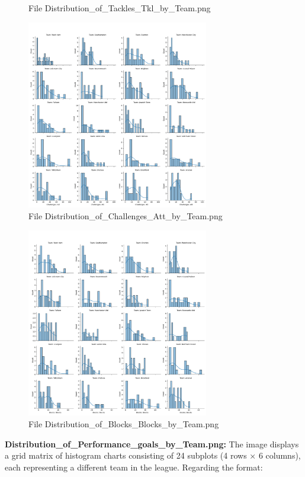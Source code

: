 \documentclass[12pt]{report}
\begin{document}
{{\begin{figure}[h]
    \caption{File Distribution\_of\_Tackles\_Tkl\_by\_Team.png} %
    \label{fig:p5}
\end{figure}
\begin{figure}[h]
    \centering
    \includegraphics[width=300px]{Distribution_of_Challenges_Att_by_Team.png}
    \caption{File Distribution\_of\_Challenges\_Att\_by\_Team.png} %
  \label{fig:p6}
\end{figure}
\begin{figure}[h]
    \centering
    \includegraphics[width=300px]{Distribution_of_Blocks_Blocks_by_Team.png}
    \caption{File Distribution\_of\_Blocks\_Blocks\_by\_Team.png} %
    \label{fig:p7}
\end{figure}
\clearpage
\textbf{Distribution\_of\_Performance\_goals\_by\_Team.png:} %
The image displays a grid matrix of histogram charts consisting of 24 subplots (4 rows × 6 columns), each representing a different team in the league. %
Regarding the format: %
}}
\end{document}
